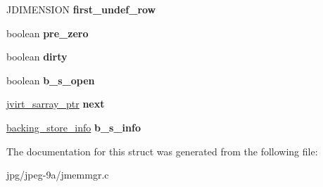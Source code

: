 \begin{DoxyCompactItemize}
\item 
\hypertarget{structjvirt__sarray__control_a049e8066e21d2fca662be25e4365259a}{J\+D\+I\+M\+E\+N\+S\+I\+O\+N {\bfseries first\+\_\+undef\+\_\+row}}\label{structjvirt__sarray__control_a049e8066e21d2fca662be25e4365259a}

\item 
\hypertarget{structjvirt__sarray__control_a59c4935ba4bbb52f9c72350a0eab41ce}{boolean {\bfseries pre\+\_\+zero}}\label{structjvirt__sarray__control_a59c4935ba4bbb52f9c72350a0eab41ce}

\item 
\hypertarget{structjvirt__sarray__control_acfe3e74075a76da809b46b43051eeb83}{boolean {\bfseries dirty}}\label{structjvirt__sarray__control_acfe3e74075a76da809b46b43051eeb83}

\item 
\hypertarget{structjvirt__sarray__control_ac40cfb14df1aba304add14c5efde3594}{boolean {\bfseries b\+\_\+s\+\_\+open}}\label{structjvirt__sarray__control_ac40cfb14df1aba304add14c5efde3594}

\item 
\hypertarget{structjvirt__sarray__control_aed2d873c89cff97caf93e77b279bdecb}{\hyperlink{structjvirt__sarray__control}{jvirt\+\_\+sarray\+\_\+ptr} {\bfseries next}}\label{structjvirt__sarray__control_aed2d873c89cff97caf93e77b279bdecb}

\item 
\hypertarget{structjvirt__sarray__control_ab5aaaed7f94dc70e0331855bdd6d4972}{\hyperlink{structbacking__store__struct}{backing\+\_\+store\+\_\+info} {\bfseries b\+\_\+s\+\_\+info}}\label{structjvirt__sarray__control_ab5aaaed7f94dc70e0331855bdd6d4972}

\end{DoxyCompactItemize}


The documentation for this struct was generated from the following file\+:\begin{DoxyCompactItemize}
\item 
jpg/jpeg-\/9a/jmemmgr.\+c\end{DoxyCompactItemize}
